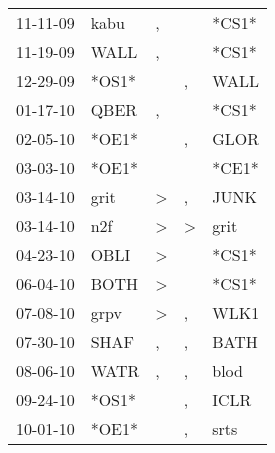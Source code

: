 \begin{supertabular}{p{0.07\textwidth}p{0.06\textwidth}p{0.02\textwidth}p{0.02\textwidth}p{0.06\textwidth}}
          11-11-09\textsuperscript{} &           kabu\textsuperscript{} &                , &               &                            *CS1* \\
          11-19-09\textsuperscript{} &           WALL\textsuperscript{} &                , &               &                            *CS1* \\
          12-29-09\textsuperscript{} &                            *OS1* &                  &             , &           WALL\textsuperscript{} \\
          01-17-10\textsuperscript{} &           QBER\textsuperscript{} &                , &               &                            *CS1* \\
          02-05-10\textsuperscript{} &                            *OE1* &                  &             , &           GLOR\textsuperscript{} \\
          03-03-10\textsuperscript{} &                            *OE1* &                  &               &                            *CE1* \\
          03-14-10\textsuperscript{} &           grit\textsuperscript{} &     \textgreater &             , &           JUNK\textsuperscript{} \\
          03-14-10\textsuperscript{} &            n2f\textsuperscript{} &     \textgreater &  \textgreater &           grit\textsuperscript{} \\
          04-23-10\textsuperscript{} &           OBLI\textsuperscript{} &     \textgreater &               &                            *CS1* \\
          06-04-10\textsuperscript{} &           BOTH\textsuperscript{} &     \textgreater &               &                            *CS1* \\
          07-08-10\textsuperscript{} &           grpv\textsuperscript{} &     \textgreater &             , &           WLK1\textsuperscript{} \\
          07-30-10\textsuperscript{} &           SHAF\textsuperscript{} &                , &             , &           BATH\textsuperscript{} \\
          08-06-10\textsuperscript{} &           WATR\textsuperscript{} &                , &             , &           blod\textsuperscript{} \\
          09-24-10\textsuperscript{} &                            *OS1* &                  &             , &           ICLR\textsuperscript{} \\
          10-01-10\textsuperscript{} &                            *OE1* &                  &             , &           srts\textsuperscript{} \\

\end{supertabular}
